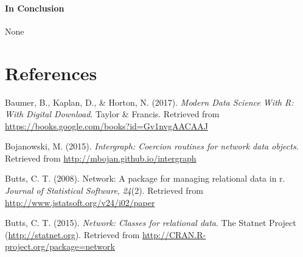 \documentclass[12pt,twoside]{amherstthesis}
\begin{document}
\begin{Shaded}
\begin{Highlighting}[]
  
  
  
  \end{Highlighting}
  \end{Shaded}
  
  \subsubsection{In Conclusion}\label{in-conclusion}
  
  None
  
  \backmatter
  
  \chapter{References}\label{references}
  
  \noindent
  
  \setlength{\parindent}{-0.20in} \setlength{\leftskip}{0.20in}
  \setlength{\parskip}{8pt}
  
  \hypertarget{refs}{}
  \hypertarget{ref-baumer_modern_2017}{}
  Baumer, B., Kaplan, D., \& Horton, N. (2017). \emph{Modern Data Science
  With R: With Digital Download}. Taylor \& Francis. Retrieved from
  \url{https://books.google.com/books?id=Gv1nvgAACAAJ}
  
  \hypertarget{ref-intergraphpackagemanual}{}
  Bojanowski, M. (2015). \emph{Intergraph: Coercion routines for network
  data objects}. Retrieved from \url{http://mbojan.github.io/intergraph}
  
  \hypertarget{ref-networkpackagearticle}{}
  Butts, C. T. (2008). Network: A package for managing relational data in
  r. \emph{Journal of Statistical Software}, \emph{24}(2). Retrieved from
  \url{http://www.jstatsoft.org/v24/i02/paper}
  
  \hypertarget{ref-networkpackagemanual}{}
  Butts, C. T. (2015). \emph{Network: Classes for relational data}. The
  Statnet Project (\url{http://statnet.org}). Retrieved from
  \url{http://CRAN.R-project.org/package=network}
  
\end{document}
